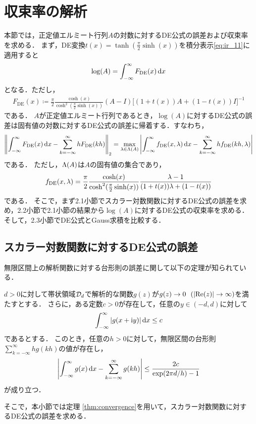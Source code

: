 \documentclass[12pt,a4paper,uplatex,dvipdfmx]{jsarticle}
\newcommand{\Fde}{F_{\mathrm{DE}}}
\newcommand{\fde}{f_{\mathrm{DE}}}
\newcommand{\sumkii}{\sum_{k=-\infty}^\infty}
\begin{document}
  \section{収束率の解析}
  本節では，正定値エルミート行列$A$の対数に対するDE公式の誤差および収束率を求める．
  まず，DE変換$t(x) = \tanh(\frac{\pi}{2}\sinh(x))$を積分表示\eqref{eq:ir_11}に適用すると
  \begin{align}\label{eq:ir_de}
    \log(A) =  \intii \Fde(x) \dd{x}
  \end{align}
  となる．ただし，
  \begin{align}
    \Fde(x) \coloneqq \frac{\pi}{2} \frac{\cosh(x)}{\cosh^2(\frac{\pi}{2}\sinh(x))} (A-I) \bigl[(1+t(x))A + (1-t(x))I\bigr]^{-1}
  \end{align}
  である．
  $A$が正定値エルミート行列であるとき，$\log(A)$に対するDE公式の誤差は固有値の対数に対するDE公式の誤差に帰着する．すなわち，
  \begin{align}\label{eq:err_logA}
    \norm{\intii{\Fde(x)}\dd{x}-\sumkii h\Fde(kh)}_2
    = \max_{\lmd\in\Lmd(A)}\left|\intii{\fde(x,\lmd)}\dd{x}-\sumkii h\fde(kh,\lmd)\right|
  \end{align}
  である．
  ただし，$\Lambda(A)$は$A$の固有値の集合であり，
  \begin{align}\label{eq:def_fde}
    \fde(x,\lmd) = \frac{\pi}{2}\frac{\cosh(x)}{\cosh^2(\frac{\pi}{2}\sinh(x))} \frac{\lmd-1}{(1+t(x))\lmd + (1-t(x))}
  \end{align}
  である．
  そこで，まず2.1小節でスカラー対数関数に対するDE公式の誤差を求め，2.2小節で2.1小節の結果から$\log(A)$に対するDE公式の収束率を求める．
  そして，2.3小節でDE公式とGauss求積を比較する．

  \subsection{スカラー対数関数に対するDE公式の誤差}
  無限区間上の解析関数に対する台形則の誤差に関して以下の定理が知られている．
  \begin{theorem}
    \label{thm:convergence}
    $d>0$に対して帯状領域$\mathcal{D}_d$で解析的な関数$g(z)$が$g(z) \to 0~~(|\mathrm{Re}(z)|\to\infty)$を満たすとする．
    さらに，ある定数$c>0$が存在して，任意の$y\in(-d,d)$に対して
    \begin{align}
      \int_{-\infty}^\infty |g(x+\mathrm{i} y)| \,\mathrm{d}{x} \le c
    \end{align}
    であるとする．
    このとき，任意の$h>0$に対して，無限区間の台形則$\sum_{k=-\infty}^\infty hg(kh)$の値が存在し，
    \begin{align}\label{eq:region_analytic_fde}
      \left|\int_{-\infty}^\infty g(x)\,\mathrm{d}{x} - \sum_{k=-\infty}^\infty g(kh)\right|
      \le \frac{2c}{\exp(2\pi d/h) - 1}
    \end{align}
    が成り立つ．
  \end{theorem}
  そこで，本小節では定理 \ref{thm:convergence}を用いて，スカラー対数関数に対するDE公式の誤差を求める．
\end{document}
